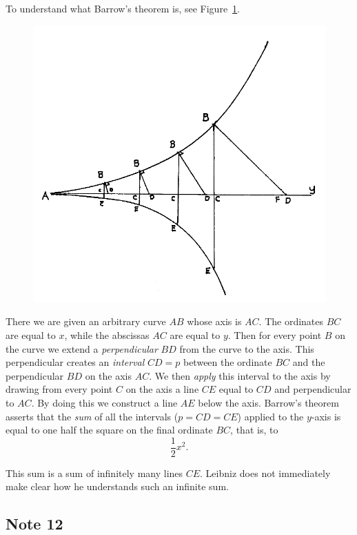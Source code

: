 \documentclass[polutonikogreek,english,twoside,openright]{article}
\begin{document}
To understand what Barrow's theorem is, see Figure~\ref{barrowfig}.
\begin{figure}[ht]
\begin{center}
\includegraphics[width=\textwidth]{fig/Figure41}
\caption{}
\label{barrowfig}
\vspace{-10pt}
\end{center}
\end{figure} 
There we are given an arbitrary curve $AB$ whose axis is $AC$.  The
ordinates $BC$ are equal to $x$, while the abscissas $AC$ are equal to
$y$.  Then for every point $B$ on the curve we extend a {\em
  perpendicular} $BD$ from the curve to the axis.  This perpendicular
creates an {\em interval} $CD = p$ between the ordinate $BC$ and the
perpendicular $BD$ on the axis $AC$.  We then {\em apply} this
interval to the axis by drawing from every point $C$ on the axis a
line $CE$ equal to $CD$ and perpendicular to $AC$. By doing this we
construct a line $AE$ below the axis.  Barrow's theorem asserts that
the {\em sum} of all the intervals ($p= CD = CE$) applied to the
$y$-axis is equal to one half the square on the final ordinate $BC$,
that is, to
  $$ \frac{1}{2}x^2.$$ 
  
  This sum is a sum of infinitely many lines $CE$.  Leibniz does not
  immediately make clear how he understands such an infinite sum.

\subsection*{Note 12}
\label{crg12}
\end{document}
